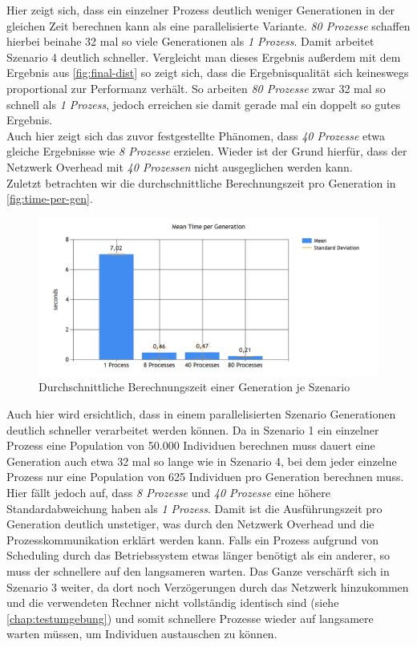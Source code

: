 \documentclass[12pt,a4paper]{scrreprt}
\newcommand{\absatz}{\\[12pt]}
\begin{document}
Hier zeigt sich, dass ein einzelner Prozess deutlich weniger Generationen in der gleichen Zeit berechnen kann als eine parallelisierte Variante. \textit{80 Prozesse} schaffen hierbei beinahe 32 mal so viele Generationen als \textit{1 Prozess}. Damit arbeitet Szenario 4 deutlich schneller. Vergleicht man dieses Ergebnis außerdem mit dem Ergebnis aus \autoref{fig:final-dist} so zeigt sich, dass die Ergebnisqualität sich keineswegs proportional zur Performanz verhält. So arbeiten \textit{80 Prozesse} zwar 32 mal so schnell als \textit{1 Prozess}, jedoch erreichen sie damit gerade mal ein doppelt so gutes Ergebnis.\\
Auch hier zeigt sich das zuvor festgestellte Phänomen, dass \textit{40 Prozesse} etwa gleiche Ergebnisse wie \textit{8 Prozesse} erzielen. Wieder ist der Grund hierfür, dass der Netzwerk Overhead mit \textit{40 Prozessen} nicht ausgeglichen werden kann.\absatz
Zuletzt betrachten wir die durchschnittliche Berechnungszeit pro Generation in \autoref{fig:time-per-gen}.
\pagebreak
\begin{figure}[ht]
  	\centering
	\includegraphics[width=400pt]{images/data_04_time_per_gen.png}
	\caption{Durchschnittliche Berechnungszeit einer Generation je Szenario}
	\label{fig:time-per-gen}
\end{figure}

Auch hier wird ersichtlich, dass in einem parallelisierten Szenario Generationen deutlich schneller verarbeitet werden können. Da in Szenario 1 ein einzelner Prozess eine Population von 50.000 Individuen berechnen muss dauert eine Generation auch etwa 32 mal so lange wie in Szenario 4, bei dem jeder einzelne Prozess nur eine Population von 625 Individuen pro Generation berechnen muss.\\
Hier fällt jedoch auf, dass \textit{8 Prozesse} und \textit{40 Prozesse} eine höhere Standardabweichung haben als \textit{1 Prozess}. Damit ist die Ausführungszeit pro Generation deutlich unstetiger, was durch den Netzwerk Overhead und die Prozesskommunikation erklärt werden kann. Falls ein Prozess aufgrund von Scheduling durch das Betriebssystem etwas länger benötigt als ein anderer, so muss der schnellere auf den langsameren warten. Das Ganze verschärft sich in Szenario 3 weiter, da dort noch Verzögerungen durch das Netzwerk hinzukommen und die verwendeten Rechner nicht vollständig identisch sind (siehe \autoref{chap:testumgebung}) und somit schnellere Prozesse wieder auf langsamere warten müssen, um Individuen austauschen zu können.
\end{document}
